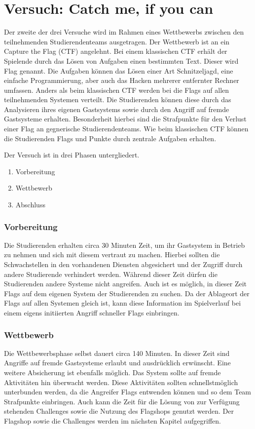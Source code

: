\section{Versuch: Catch me, if you can}
\label{sec:Versuch}

Der zweite der drei Versuche  wird im Rahmen eines Wettbewerbs zwischen den teilnehmenden Studierendenteams ausgetragen. Der Wettbewerb ist an ein Capture the Flag (CTF) angelehnt. Bei einem klassischen CTF erhält der Spielende durch das Lösen von Aufgaben einen bestimmten Text. Dieser wird Flag genannt. Die Aufgaben können das Lösen einer Art Schnitzeljagd, eine einfache Programmierung, aber auch das Hacken mehrerer entfernter Rechner umfassen. Anders als beim klassischen CTF werden bei  die Flags auf allen teilnehmenden Systemen verteilt. \cite{tanWhatCTFHow2020} Die Studierenden können diese durch das Analysieren ihres eigenen Gastsystems sowie durch den Angriff auf fremde Gastsysteme erhalten. Besonderheit hierbei sind die Strafpunkte für den Verlust einer Flag an gegnerische Studierendenteams. Wie beim klassischen CTF können die Studierenden Flags und Punkte durch zentrale Aufgaben erhalten.

\newpage

Der Versuch ist in drei Phasen untergliedert.
\begin{enumerate}
	\item Vorbereitung
	\item Wettbewerb
	\item Abschluss
\end{enumerate}

\subsubsection{Vorbereitung}
Die Studierenden erhalten circa 30 Minuten Zeit, um ihr Gastsystem in Betrieb zu nehmen und sich mit diesem vertraut zu machen. Hierbei sollten die Schwachstellen in den vorhandenen Diensten abgesichert und der Zugriff durch andere Studierende verhindert werden. Während dieser Zeit dürfen die Studierenden andere Systeme nicht angreifen. Auch ist es möglich, in dieser Zeit Flags auf dem eigenen System der Studierenden zu suchen. Da der Ablageort der Flags auf allen Systemen gleich ist, kann diese Information im Spielverlauf bei einem eigens initiierten Angriff schneller Flags einbringen.

\subsubsection{Wettbewerb}
Die Wettbewerbsphase selbst dauert circa 140 Minuten. In dieser Zeit sind Angriffe auf fremde Gastsysteme erlaubt und ausdrücklich erwünscht. Eine weitere Absicherung ist ebenfalls möglich. Das System sollte auf fremde Aktivitäten hin überwacht werden. Diese Aktivitäten sollten schnellstmöglich unterbunden werden, da die Angreifer Flags entwenden können und so dem Team Strafpunkte einbringen. Auch kann die Zeit für die Lösung von zur Verfügung stehenden Challenges sowie die Nutzung des Flagshops genutzt werden. Der Flagshop sowie die Challenges werden im nächsten Kapitel aufgegriffen.

